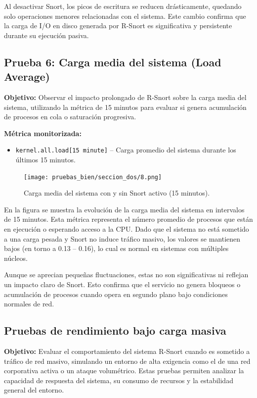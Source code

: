 \documentclass[11pt,a4paper,twoside]{report}
\begin{document}
Al desactivar Snort, los picos de escritura se reducen drásticamente, quedando solo operaciones menores relacionadas con el sistema. Este cambio confirma que la carga de I/O en disco generada por R-Snort es significativa y persistente durante su ejecución pasiva.\newline

\subsection*{Prueba 6: Carga media del sistema (Load Average)}

\textbf{Objetivo:}  
Observar el impacto prolongado de R-Snort sobre la carga media del sistema, utilizando la métrica de 15 minutos para evaluar si genera acumulación de procesos en cola o saturación progresiva.\newline

\textbf{Métrica monitorizada:}
\begin{itemize}
	\item \texttt{kernel.all.load[15 minute]} – Carga promedio del sistema durante los últimos 15 minutos.
\end{itemize}

\begin{figure}[H]
	\centering
	\texttt{[image: pruebas\_bien/seccion\_dos/8.png]}
	\caption{Carga media del sistema con y sin Snort activo (15 minutos).}
\end{figure}

En la figura se muestra la evolución de la carga media del sistema en intervalos de 15 minutos. Esta métrica representa el número promedio de procesos que están en ejecución o esperando acceso a la CPU. Dado que el sistema no está sometido a una carga pesada y Snort no induce tráfico masivo, los valores se mantienen bajos (en torno a 0.13 – 0.16), lo cual es normal en sistemas con múltiples núcleos.\newline

Aunque se aprecian pequeñas fluctuaciones, estas no son significativas ni reflejan un impacto claro de Snort. Esto confirma que el servicio no genera bloqueos o acumulación de procesos cuando opera en segundo plano bajo condiciones normales de red.

\subsection{Pruebas de rendimiento bajo carga masiva}

\textbf{Objetivo:}  
Evaluar el comportamiento del sistema R-Snort cuando es sometido a tráfico de red masivo, simulando un entorno de alta exigencia como el de una red corporativa activa o un ataque volumétrico. Estas pruebas permiten analizar la capacidad de respuesta del sistema, su consumo de recursos y la estabilidad general del entorno.\newline
\end{document}
